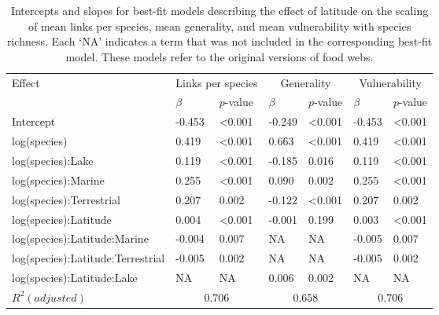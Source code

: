 \documentclass[12pt]{article}
\begin{document}
\begin{table}[!h]
\caption{Intercepts and slopes for best-fit models describing the effect of latitude on the scaling of mean links per species, mean generality, and mean vulnerability with species richness. Each `NA' indicates a term that was not included in the corresponding best-fit model. These models refer to the original versions of food webs. }
\label{Bestfits}
\begin{tabular}{l | l l  l l  l l }
Effect          & \multicolumn{2}{c|}{Links per species} & \multicolumn{2}{c|}{Generality} 
                & \multicolumn{2}{c}{Vulnerability}\\
                & $\beta$ & $p$-value     &  $\beta$ & $p$-value    &  $\beta$ & $p$-value  \\
\hline
Intercept               &-0.453 & \textless0.001 & -0.249 & \textless0.001 & -0.453 & \textless0.001 \\
log(species)            & 0.419 & \textless0.001 &  0.663 & \textless0.001 &  0.419 & \textless0.001 \\
log(species):Lake       & 0.119 & \textless0.001 & -0.185 & 0.016          &  0.119 & \textless0.001 \\
log(species):Marine     & 0.255 & \textless0.001 &  0.090 & 0.002          &  0.255 & \textless0.001 \\
log(species):Terrestrial& 0.207 & 0.002          & -0.122 & \textless0.001 &  0.207 & 0.002 \\
log(species):Latitude   & 0.004 & \textless0.001 & -0.001 & 0.199          &  0.003 & \textless0.001 \\
log(species):Latitude:Marine&-0.004 & 0.007      &  NA    &  NA            & -0.005 & 0.007 \\
log(species):Latitude:Terrestrial&-0.005 & 0.002 &  NA    &  NA            & -0.005 & 0.002 \\
log(species):Latitude:Lake & NA & NA             &  0.006 & 0.002          &  NA    & NA    \\
\hline
$R^{2} (adjusted)$   & \multicolumn{2}{c|}{0.706} & \multicolumn{2}{c|}{0.658} & \multicolumn{2}{c}{0.706} \\
\hline
\end{tabular}
\end{table}
\end{document}

